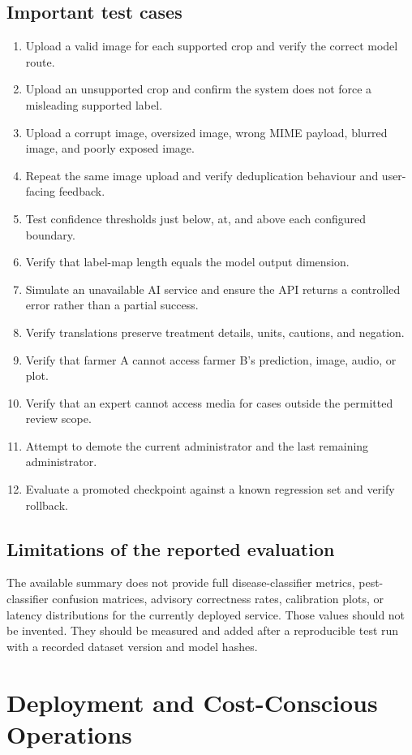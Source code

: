 \documentclass[12pt,a4paper,oneside,openany]{report}
\begin{document}
\section{Important test cases}
\begin{enumerate}
\item Upload a valid image for each supported crop and verify the correct model route.
\item Upload an unsupported crop and confirm the system does not force a misleading supported label.
\item Upload a corrupt image, oversized image, wrong MIME payload, blurred image, and poorly exposed image.
\item Repeat the same image upload and verify deduplication behaviour and user-facing feedback.
\item Test confidence thresholds just below, at, and above each configured boundary.
\item Verify that label-map length equals the model output dimension.
\item Simulate an unavailable AI service and ensure the API returns a controlled error rather than a partial success.
\item Verify translations preserve treatment details, units, cautions, and negation.
\item Verify that farmer A cannot access farmer B's prediction, image, audio, or plot.
\item Verify that an expert cannot access media for cases outside the permitted review scope.
\item Attempt to demote the current administrator and the last remaining administrator.
\item Evaluate a promoted checkpoint against a known regression set and verify rollback.
\end{enumerate}

\section{Limitations of the reported evaluation}
The available summary does not provide full disease-classifier metrics, pest-classifier confusion matrices, advisory correctness rates, calibration plots, or latency distributions for the currently deployed service. Those values should not be invented. They should be measured and added after a reproducible test run with a recorded dataset version and model hashes.

\chapter{Deployment and Cost-Conscious Operations}
\end{document}

